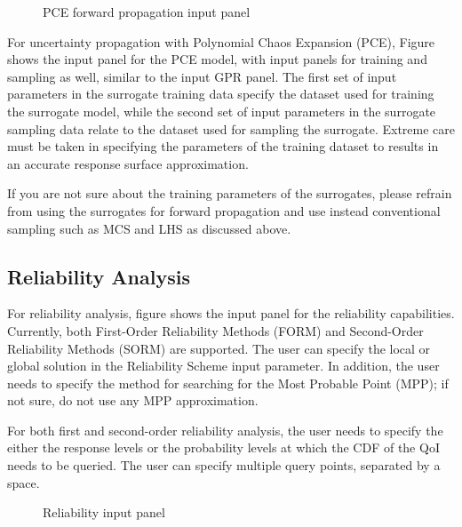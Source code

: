 \begin{figure}[!htbp]
  \caption{PCE forward propagation input panel}
  \label{fig:pce}
\end{figure}

For uncertainty propagation with Polynomial Chaos Expansion (PCE), Figure  shows the input panel for the PCE model, with input panels for training and sampling as well, similar to the input GPR panel. The first set of input parameters in the surrogate training data specify the dataset used for training the surrogate model, while the second set of input parameters in the surrogate sampling data relate to the dataset used for sampling the surrogate. Extreme care must be taken in specifying the parameters of the training dataset to results in an accurate response surface approximation. 

If you are not sure about the training parameters of the surrogates, please refrain from using the surrogates for forward propagation and use instead conventional sampling such as MCS and LHS as discussed above. 

\subsection{Reliability Analysis}

For reliability analysis, figure  shows the input panel for the reliability capabilities. Currently, both First-Order Reliability Methods (FORM) and Second-Order Reliability Methods (SORM) are supported. The user can specify the local or global solution in the Reliability Scheme input parameter. In addition, the user needs to specify the method for searching for the Most Probable Point (MPP); if not sure, do not use any MPP approximation. 

For both first and second-order reliability analysis, the user needs to specify the either the response levels or the probability levels at which the CDF of the QoI needs to be queried. The user can specify multiple query points, separated by a space. 


\begin{figure}[!htbp]
  \caption{Reliability input panel}
  \label{fig:rel}
\end{figure}


